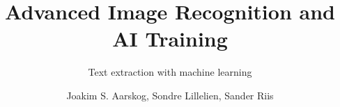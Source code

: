 \documentclass[
]{thesistemplate}
\affiliation{Østfold University College}
\title{Advanced Image Recognition and AI Training} %
\subtitle{Text extraction with machine learning}
\author{
    Joakim S. Aarskog,
    Sondre Lillelien,
    Sander Riis
}
\begin{document}
\maketitle          %
\frontmatter        %





\tableofcontents    %

\listoffigures      %

\mainmatter  %











\glsaddallunused
\printglossaries           %

\appendix                   %
\end{document}
